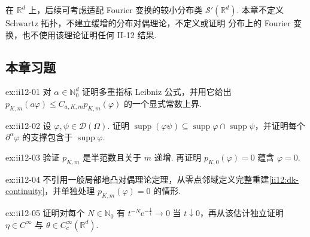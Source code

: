 \begin{FARemark}
在 \(\displaystyle\mathbb R^d\) 上，后续可考虑适配 Fourier 变换的较小分布类 \(\displaystyle\mathcal S'(\mathbb R^d)\). 本章不定义 Schwartz 拓扑，不建立缓增的分布对偶理论，不定义或证明 分布上的 Fourier 变换，也不使用该理论证明任何 II-12 结果.
\end{FARemark}

\subsection*{本章习题}\label{sec:ii12-exercises}

\begin{FAExercise}{ex:ii12-01}
对 \(\displaystyle\alpha\in\mathbb N_0^d\) 证明多重指标 Leibniz 公式，并用它给出 \(\displaystyle p_{K,m}(a\varphi)\leqslant C_{a,K,m}p_{K,m}(\varphi)\) 的一个显式常数上界.
\end{FAExercise}

\begin{FAExercise}[测试函数支撑]{ex:ii12-02}
设 \(\displaystyle\varphi,\psi\in\mathcal D(\Omega)\). 证明 \(\displaystyle\operatorname{supp}(\varphi\psi)\subseteq\operatorname{supp}\varphi\cap\operatorname{supp}\psi\)，并证明每个 \(\displaystyle\partial^\alpha\varphi\) 的支撑包含于 \(\displaystyle\operatorname{supp}\varphi\).
\end{FAExercise}

\begin{FAExercise}{ex:ii12-03}
验证 \(\displaystyle p_{K,m}\) 是半范数且关于 \(\displaystyle m\) 递增. 再证明 \(\displaystyle p_{K,0}(\varphi)=0\) 蕴含 \(\displaystyle\varphi=0\).
\end{FAExercise}

\begin{FAExercise}[有限阶连续性判据]{ex:ii12-04}
不引用一般局部地凸对偶理论定理，从零点邻域定义完整重建\autoref{ii12:dk-continuity}，并单独处理 \(\displaystyle p_{K,m}(\varphi)=0\) 的情形.
\end{FAExercise}

\begin{FAExercise}[平坦函数与隆起]{ex:ii12-05}
证明对每个 \(\displaystyle N\in\mathbb N_0\) 有 \(\displaystyle t^{-N}\mathrm{e}^{-\frac{1}{t}}\to0\) 当 \(\displaystyle t\downarrow0\)，再从该估计独立证明 \(\displaystyle\eta\in C^\infty\) 与 \(\displaystyle\theta\in C_c^\infty(\mathbb R^d)\).
\end{FAExercise}

